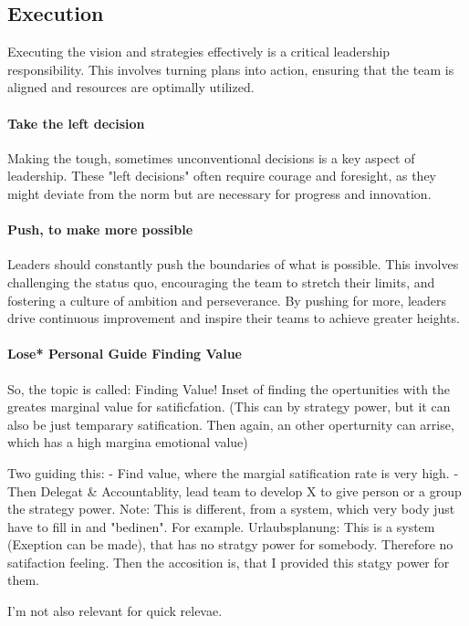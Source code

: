 \subsection{Execution}
Executing the vision and strategies effectively is a critical leadership responsibility. This involves turning plans into action, ensuring that the team is aligned and resources are optimally utilized.

\paragraph{Take the left decision}
Making the tough, sometimes unconventional decisions is a key aspect of leadership. These "left decisions" often require courage and foresight, as they might deviate from the norm but are necessary for progress and innovation.

\paragraph{Push, to make more possible}
Leaders should constantly push the boundaries of what is possible. This involves challenging the status quo, encouraging the team to stretch their limits, and fostering a culture of ambition and perseverance. By pushing for more, leaders drive continuous improvement and inspire their teams to achieve greater heights.

\paragraph{Lose* Personal Guide Finding Value}


So, the topic is called: Finding Value!
Inset of finding the opertunities with the greates marginal value for satificfation. (This can by strategy power, but it can also be just temparary satification. Then again, an other operturnity can arrise, which has a high margina emotional value)

Two guiding this:
- Find value, where the margial satification rate is very high. 
- Then Delegat & Accountablity, lead team to develop X to give person or a group the strategy power.
Note: This is different, from a system, which very body just have to fill in and "bedinen". For example. Urlaubsplanung: This is a system (Exeption can be made), that has no stratgy power for somebody. Therefore no satifaction feeling. Then the accosition is, that I provided this statgy power for them.

I'm not also relevant for quick relevae.

